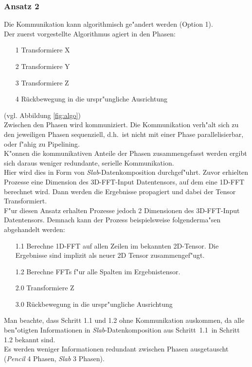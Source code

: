 \subsubsection{Ansatz 2}
Die Kommunikation kann algorithmisch ge"andert werden (Option 1).\\
Der zuerst vorgestellte Algorithmus agiert in den Phasen:
\begin{itemize}
	\item[1] Transformiere X
	\item[2] Transformiere Y
	\item[3] Transformiere Z
	\item[4] Rückbewegung in die urspr"ungliche Ausrichtung
\end{itemize}
(vgl. Abbildung \ref{fig:algo})\\
Zwischen den Phasen wird kommuniziert. Die Kommunikation verh"alt sich zu den jeweiligen Phasen sequenziell, d.h.~ist nicht mit einer Phase parallelisierbar, oder f"ahig zu Pipelining.\\
K"onnen die kommunikativen Anteile der Phasen zusammengefasst werden ergibt sich daraus weniger redundante, serielle Kommunikation.\\
Hier wird dies in Form von \textit{Slab}-Datenkomposition durchgef"uhrt.
Zuvor erhielten Prozesse eine Dimension des 3D-FFT-Input Datentensors, auf dem eine 1D-FFT berechnet wird. Dann werden die Ergebnisse propagiert und dabei der Tensor Transformiert.\\
F"ur diesen Ansatz erhalten Prozesse jedoch 2 Dimensionen des 3D-FFT-Input Datentensors. Demnach kann der Prozess beispielsweise folgenderma"sen abgehandelt werden:
\begin{itemize}
	\item[1.1] Berechne 1D-FFT auf allen Zeilen im bekannten 2D-Tensor. Die Ergebnisse sind implizit als neuer 2D Tensor zusammengef"ugt.
	\item[1.2] Berechne FFTs f"ur alle Spalten im Ergebnistensor.
	\item[2.0] Transformiere Z
	\item[3.0] Rückbewegung in die urspr"ungliche Ausrichtung
\end{itemize}
Man beachte, dass Schritt 1.1 und 1.2 ohne Kommunikation auskommen, da alle ben"otigten Informationen in \textit{Slab}-Datenkomposition aus Schritt~1.1~in Schritt 1.2 bekannt sind.\\
Es werden weniger Informationen redundant zwischen Phasen ausgetauscht (\textit{Pencil} 4 Phasen, \textit{Slab} 3 Phasen).\\
